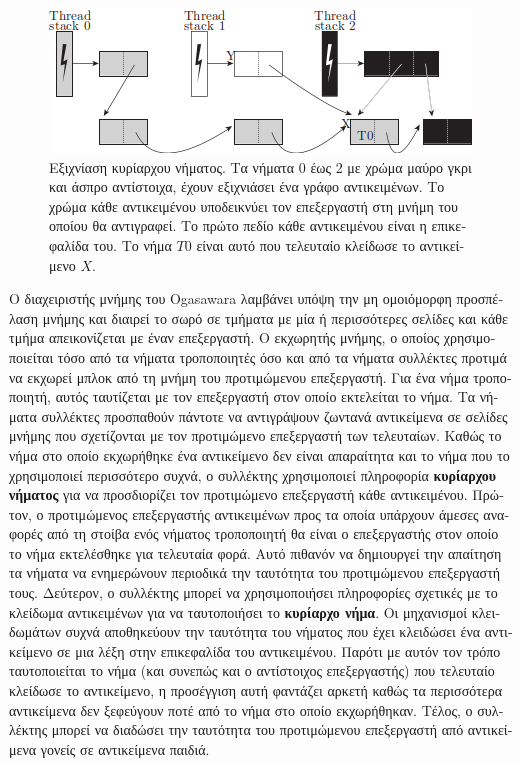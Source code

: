 \begin{greek}
\begin{figure}
  \centering
  \includegraphics{figures/par_3}
  \caption[Εξιχνίαση κυρίαρχου νήματος.]
    {Εξιχνίαση κυρίαρχου νήματος. Τα νήματα 0 έως 2 με χρώμα
     μαύρο γκρι και άσπρο αντίστοιχα, έχουν εξιχνιάσει ένα
     γράφο αντικειμένων. Το χρώμα κάθε αντικειμένου υποδεικνύει
     τον επεξεργαστή στη μνήμη του οποίου θα αντιγραφεί. Το
     πρώτο πεδίο κάθε αντικειμένου είναι η επικεφαλίδα του.
     Το νήμα $T0$ είναι αυτό που τελευταίο κλείδωσε το αντικείμενο
     $X$.}
  \label{fig:par_3}
\end{figure}

Ο διαχειριστής μνήμης του Ogasawara \cite{DBLP:conf/oopsla/Ogasawara09}
λαμβάνει υπόψη την μη ομοιόμορφη προσπέλαση μνήμης και
διαιρεί το σωρό σε τμήματα με μία ή περισσότερες σελίδες
και κάθε τμήμα απεικονίζεται με έναν επεξεργαστή. Ο εκχωρητής
μνήμης, ο οποίος χρησιμοποιείται τόσο από τα νήματα τροποποιητές
όσο και από τα νήματα συλλέκτες προτιμά να εκχωρεί μπλοκ από
τη μνήμη του προτιμώμενου επεξεργαστή. Για ένα νήμα τροποποιητή,
αυτός ταυτίζεται με τον επεξεργαστή στον οποίο εκτελείται το
νήμα. Τα νήματα συλλέκτες προσπαθούν πάντοτε να αντιγράψουν
ζωντανά αντικείμενα σε σελίδες μνήμης που σχετίζονται με τον
προτιμώμενο επεξεργαστή των τελευταίων. Καθώς το νήμα στο
οποίο εκχωρήθηκε ένα αντικείμενο δεν είναι απαραίτητα και το
νήμα που το χρησιμοποιεί περισσότερο συχνά, ο συλλέκτης
χρησιμοποιεί πληροφορία \textbf{κυρίαρχου νήματος} για να
προσδιορίζει τον προτιμώμενο επεξεργαστή κάθε αντικειμένου.
Πρώτον, ο προτιμώμενος επεξεργαστής αντικειμένων προς τα οποία
υπάρχουν άμεσες αναφορές από τη στοίβα ενός νήματος τροποποιητή
θα είναι ο επεξεργαστής στον οποίο το νήμα εκτελέσθηκε για
τελευταία φορά. Αυτό πιθανόν να δημιουργεί την απαίτηση τα
νήματα να ενημερώνουν περιοδικά την ταυτότητα του προτιμώμενου
επεξεργαστή τους. Δεύτερον, ο συλλέκτης μπορεί να χρησιμοποιήσει
πληροφορίες σχετικές με το κλείδωμα αντικειμένων για να ταυτοποιήσει
το \textbf{κυρίαρχο νήμα}. Οι μηχανισμοί κλειδωμάτων συχνά
αποθηκεύουν την ταυτότητα του νήματος που έχει κλειδώσει ένα
αντικείμενο σε μια λέξη στην επικεφαλίδα του αντικειμένου.
Παρότι με αυτόν τον τρόπο ταυτοποιείται το νήμα (και συνεπώς
και ο αντίστοιχος επεξεργαστής) που τελευταίο κλείδωσε το
αντικείμενο, η προσέγγιση αυτή φαντάζει αρκετή καθώς τα
περισσότερα αντικείμενα δεν ξεφεύγουν ποτέ από το νήμα στο
οποίο εκχωρήθηκαν. Τέλος, ο συλλέκτης μπορεί να διαδώσει
την ταυτότητα του προτιμώμενου επεξεργαστή από αντικείμενα
γονείς σε αντικείμενα παιδιά.
  

\end{greek}
